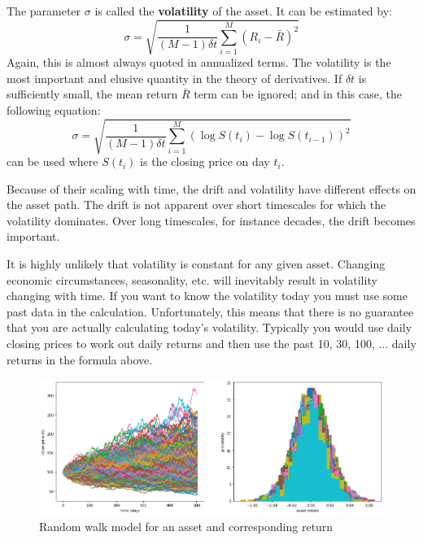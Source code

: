 The parameter $\sigma$ is called the \textbf{volatility} of the asset. It can be estimated by:
\begin{equation}
    \sigma = \sqrt{\frac{1}{\left( M - 1 \right) \delta t} \sum_{i = 1}^{M} \left( R_i - \bar{R} \right)^2}
    \label{equ:volatility_1}
\end{equation}
Again, this is almost always quoted in annualized terms. The volatility is the most important and elusive quantity in the theory of derivatives. If $\delta t$ is sufficiently small, the mean return $\bar{R}$ term can be ignored; and in this case, the following equation:
\begin{equation}
    \sigma = \sqrt{\frac{1}{\left( M - 1 \right) \delta t} \sum_{i = 1}^{M} \left( \log S(t_i) - \log S(t_{i-1}) \right)^2}
    \label{equ:volatility_2}
\end{equation}
can be used where $S(t_i)$ is the closing price on day $t_i$.

Because of their scaling with time, the drift and volatility have different effects on the asset path. The drift is not apparent over short timescales for which the volatility dominates. Over long timescales, for instance decades, the drift becomes important.

It is highly unlikely that volatility is constant for any given asset. Changing economic circumstances, seasonality, etc. will inevitably result in volatility changing with time. If
you want to know the volatility today you must use some past data in the calculation.  Unfortunately, this means that there is no guarantee that you are actually calculating today's volatility. Typically you would use daily closing prices to work out daily returns and then use the past 10, 30, 100, ... daily returns in the formula above.

\begin{figure}[H]
    \centering
    \includegraphics[width=\textwidth]{figure/random walk.png}
    \caption{Random walk model for an asset and corresponding return}
    \label{fig:random_walk_500}
\end{figure}

